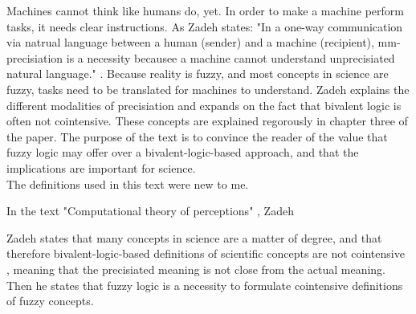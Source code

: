 


Machines cannot think like humans do, yet. In order to make a machine perform tasks, it needs clear instructions. As Zadeh states: "In a one-way communication via natrual language between a human (sender) and a machine (recipient), mm-precisiation is a necessity becausee a machine cannot understand unprecisiated natural language." \cite[2760]{is_there_a_need_for_fuzzy_logic}. Because reality is fuzzy, and most concepts in science are fuzzy, tasks need to be translated for machines to understand.
Zadeh explains the different modalities of precisiation and expands on the fact that bivalent logic is often not cointensive. These concepts are explained regorously in chapter three of the paper.
The purpose of the text is to convince the reader of the value that fuzzy logic may offer over a bivalent-logic-based approach, and that the implications are important for science. \\
The definitions used in this text were new to me.


In the text "Computational theory of perceptions" \cite[2770]{is_there_a_need_for_fuzzy_logic}, Zadeh









Zadeh states that many concepts in science are a matter of degree, and that therefore bivalent-logic-based definitions of scientific concepts are not cointensive \cite[2769]{is_there_a_need_for_fuzzy_logic}, meaning that the precisiated meaning is not close from the actual meaning. Then he states that fuzzy logic is a necessity to formulate cointensive definitions of fuzzy concepts.



